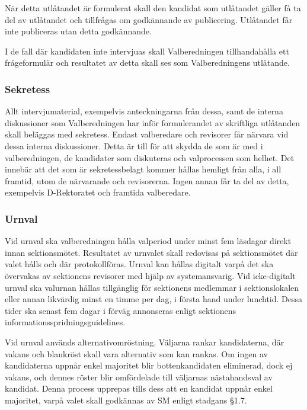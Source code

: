 \documentclass{dgovdoc}
\begin{document}
När detta utlåtandet är formulerat skall den kandidat som utlåtandet gäller
få ta del av utlåtandet och tillfrågas om godkännande av publicering.
Utlåtandet får inte publiceras utan detta godkännande.

I de fall där kandidaten inte intervjuas skall Valberedningen tillhandahålla
ett frågeformulär och resultatet av detta skall ses som Valberedningens utlåtande.

\subsubsection{Sekretess}

Allt intervjumaterial, exempelvis anteckningarna från dessa, samt de interna
diskussioner som Valberedningen har inför formulerandet av skriftliga utlåtanden
skall beläggas med sekretess. Endast valberedare och revisorer får närvara vid
dessa interna diskussioner. Detta är till för att skydda de som är med i
valberedningen, de kandidater som diskuteras och valprocessen som helhet.
Det innebär att det som är sekretessbelagt kommer hållas hemligt från alla,
i all framtid, utom de närvarande och revisorerna. Ingen annan får ta del av detta,
exempelvis D-Rektoratet och framtida valberedare.

\subsubsection{Urnval}

Vid urnval ska valberedningen hålla valperiod under minst fem läsdagar direkt
innan sektionsmötet. Resultatet av urnvalet skall redovisas på sektionsmötet
där valet hålls och där protokollföras. Urnval kan hållas digitalt varpå det
ska övervakas av sektionens revisorer med hjälp av systemansvarig. Vid icke-digitalt
urnval ska valurnan hållas tillgänglig för sektionens medlemmar i sektionslokalen
eller annan likvärdig minst en timme per dag, i första hand under lunchtid.
Dessa tider ska senast fem dagar i förväg annonseras enligt sektionens
informationsspridningsguidelines.

Vid urnval används alternativomröstning. Väljarna rankar kandidaterna, där
vakans och blankröst skall vara alternativ som kan rankas. Om ingen av
kandidaterna uppnår enkel majoritet blir bottenkandidaten eliminerad, dock
ej vakans, och dennes röster blir omfördelade till väljarnas nästahandsval av
kandidat. Denna process upprepas tills dess att en kandidat uppnår enkel
majoritet, varpå valet skall godkännas av SM enligt stadgans §1.7.
\end{document}
